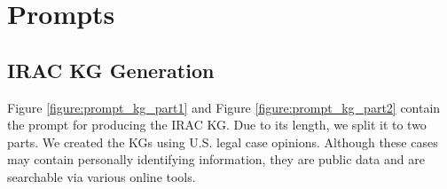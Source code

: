 \section{Prompts}
\label{section:appendix_prompt}

\subsection{IRAC KG Generation}
\label{section:appendix_prompt_kg}

Figure \ref{figure:prompt_kg_part1} and Figure \ref{figure:prompt_kg_part2} contain the prompt for producing the IRAC KG. Due to its length, we split it to two parts. We created the KGs using U.S. legal case opinions. Although these cases may contain personally identifying information, they are public data and are searchable via various online tools.
